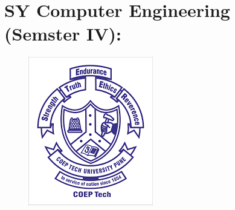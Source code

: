 \documentclass[12pt,a4pages]{article}
\begin{document}
\newpage




\section{SY Computer Engineering (Semster IV):}


\begin{figure}[h]
\centering
\includegraphics[scale=.4]{coep}
\end{figure}
\end{document}
